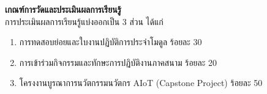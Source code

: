 \vspace{0.3cm}
\noindent\textbf{เกณฑ์การวัดและประเมินผลการเรียนรู้}\\
การประเมินผลการเรียนรู้แบ่งออกเป็น 3 ส่วน ได้แก่
\begin{enumerate}
    \item การทดสอบย่อยและใบงานปฏิบัติการประจำโมดูล ร้อยละ 30
    \item การเข้าร่วมกิจกรรมและทักษะการปฏิบัติงานภาคสนาม ร้อยละ 20
    \item โครงงานบูรณาการนวัตกรรมนวัตกร AIoT (Capstone Project) ร้อยละ 50
\end{enumerate}
\clearpage
